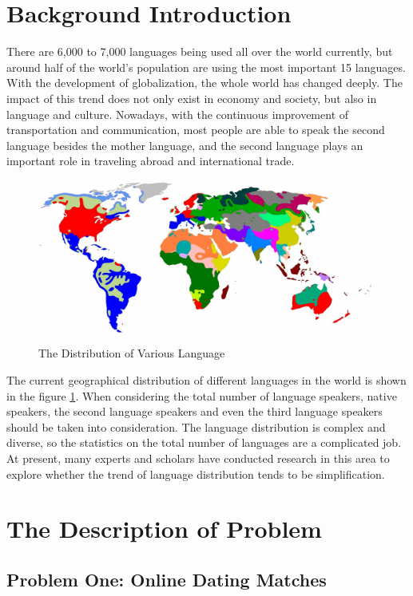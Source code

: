 \section{Background Introduction}
        There are 6,000 to 7,000 languages being used all over the world currently, but around half of the world's population are using the most important 15 languages. With the development of globalization, the whole world has changed deeply. The impact of this trend does not only exist in economy and society, but also in language and culture. Nowadays, with the continuous improvement of transportation and communication, most people are able to speak the second language besides the mother language, and the second language plays an important role in traveling abroad and international trade.
    \begin{figure}[!htbp]                                           %
        \centering
        \includegraphics[width = .8\textwidth]{introduction.jpg}        %
        \caption{The Distribution of Various Language}                                  
        \label{introduction}                                           
    \end{figure}

    The current geographical distribution of different languages in the world is shown in the figure \ref{introduction}. When considering the total number of language speakers, native speakers, the second language speakers and even the third language speakers should be taken into consideration. The language distribution is complex and diverse, so the statistics on the total number of languages are a complicated job. At present, many experts and scholars have conducted research in this area to explore whether the trend of language distribution tends to be simplification.
\section{The Description of Problem}   
\subsection{Problem One: Online Dating Matches  }  
           

